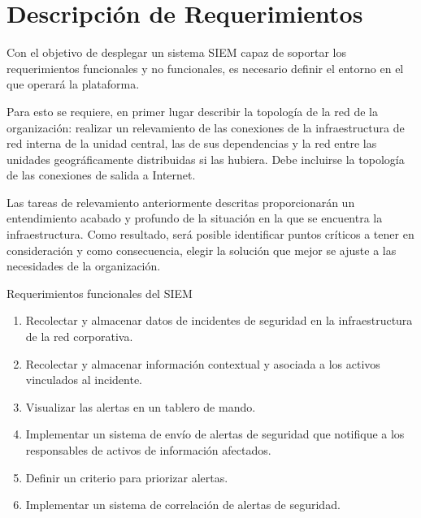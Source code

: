 \chapter{Descripción de Requerimientos}
    Con el objetivo de desplegar un sistema SIEM capaz de soportar los requerimientos funcionales y no funcionales, es necesario definir el entorno en el que operará la plataforma. \par
    Para esto se requiere, en primer lugar describir la topología de la red de la organización: realizar un relevamiento de las conexiones  de la infraestructura de red interna de la unidad central, las de sus dependencias y la red entre las unidades geográficamente distribuidas si las hubiera. Debe incluirse la topología de las conexiones de salida a Internet. \par
    Las tareas de relevamiento anteriormente descritas proporcionarán un entendimiento acabado y profundo de la situación en la que se encuentra la infraestructura. Como resultado, será posible identificar puntos críticos a tener en consideración y como consecuencia, elegir la solución que mejor se ajuste a las necesidades de la organización. \par

    \begin{section}{Requerimientos funcionales del SIEM}
    \begin{enumerate}
        \item Recolectar y almacenar datos de incidentes de seguridad en la infraestructura de la red corporativa.
        \item Recolectar y almacenar información contextual y asociada a los activos vinculados  al incidente.
        \item Visualizar las alertas en un tablero de mando. 
        \item Implementar un sistema de envío de alertas de seguridad que notifique a los responsables de activos de información afectados.
        \item Definir un criterio para priorizar alertas.
        \item Implementar un sistema de correlación de alertas de seguridad.
    \end{enumerate}
        
    \end{section}
    
